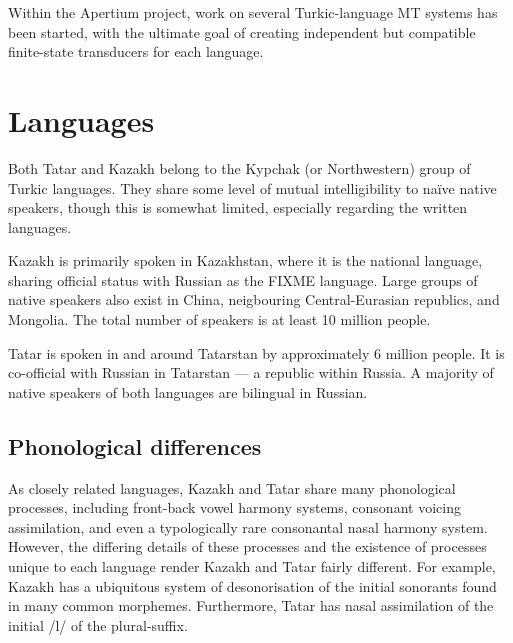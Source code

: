 \documentclass[11pt]{article}
\begin{document}

Within the Apertium project, work on several Turkic-language MT systems has been started, with the ultimate goal of creating independent but compatible
finite-state transducers for each language.

\section{Languages}
\label{sec:lang}

Both Tatar and Kazakh belong to the Kypchak (or Northwestern) group of Turkic
languages.  They share some level of mutual intelligibility to naïve native speakers, though this is somewhat limited, especially regarding the written languages.

Kazakh is primarily spoken in Kazakhstan, where it is the national
language, sharing official status with Russian as the FIXME language.
Large groups of native speakers also exist in China, neigbouring
Central-Eurasian republics, and Mongolia. The total number of speakers is at least 10 million people.

Tatar is spoken in and around Tatarstan by
approximately 6 million people. It is co-official with Russian in Tatarstan ---
a republic within Russia.  A majority of native speakers of both languages are bilingual in Russian.

\subsection{Phonological differences}
As closely related languages, Kazakh and Tatar share many phonological processes, including front-back vowel harmony systems, consonant voicing assimilation, and even a typologically rare consonantal nasal harmony system.  However, the differing details of these processes and the existence of processes unique to each language render Kazakh and Tatar fairly different.  For example, Kazakh has a ubiquitous system of desonorisation of the initial sonorants found in many common morphemes.  Furthermore, Tatar has nasal assimilation of the initial /l/ of the plural-suffix.
\end{document}
